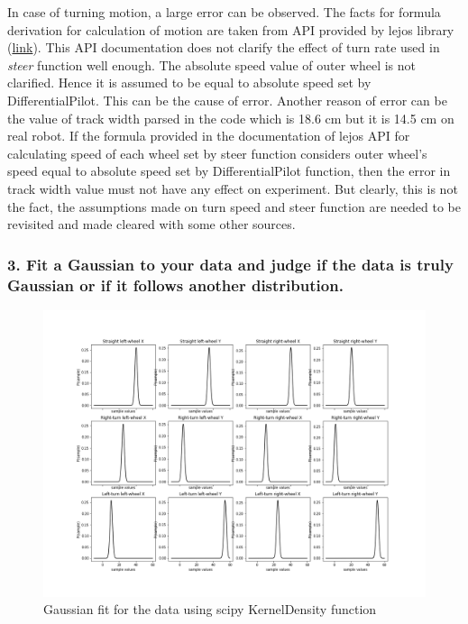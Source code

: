 \documentclass[11pt,a4paper,openright,twoside]{extreport}
\begin{document}
In case of turning motion, a large error can be observed. The facts for formula derivation for calculation of motion are taken from API provided by lejos library (\href{http://www.lejos.org/nxt/nxj/api/lejos/robotics/navigation/DifferentialPilot.html#steer(double)}{link}). This API documentation does not clarify the effect of turn rate used in \textit{steer} function well enough. The absolute speed value of outer wheel is not clarified. Hence it is assumed to be equal to absolute speed set by DifferentialPilot. This can be the cause of error.
Another reason of error can be the value of track width parsed in the code which is 18.6 cm but it is 14.5 cm on real robot.
If the formula provided in the documentation of lejos API for calculating speed of each wheel set by steer function considers outer wheel's speed equal to absolute speed set by DifferentialPilot function, then the error in track width value must not have any effect on experiment. But clearly, this is not the fact, the assumptions made on turn speed and steer function are needed to be revisited and made cleared with some other sources.      




\subsubsection*{3. Fit a Gaussian to your data and judge if the data is truly Gaussian or if it follows another distribution.}

\begin{figure}[ht]
\centering
\includegraphics[width=\textwidth]{gaussian_fits.png}
\caption{Gaussian fit for the data using scipy KernelDensity function}
\end{figure}
\end{document}
